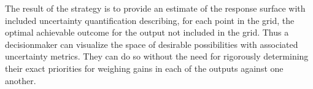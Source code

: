 \documentclass[12pt]{article}
\begin{document}
%

%
The result of the strategy is to provide an estimate of the response surface with included uncertainty quantification describing, for each point in the grid, the optimal achievable outcome for the output not included in the grid.
%
Thus a decisionmaker can visualize the space of desirable possibilities with associated uncertainty metrics. 
%
They can do so without the need for rigorously determining their exact priorities for weighing gains in each of the outputs against one another.
\end{document}
